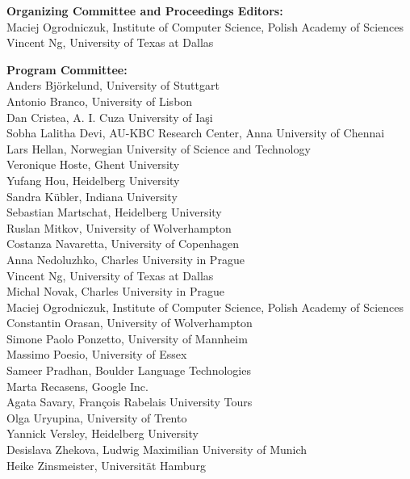 \documentclass[11pt]{article}
\begin{document}

\vspace*{0.5cm}


\begin{description}
\item{\bf Organizing Committee and Proceedings Editors:}\vspace{2mm} \\
Maciej Ogrodniczuk, Institute of Computer Science, Polish Academy of Sciences \\
Vincent Ng, University of Texas at Dallas

\vspace{3mm}
\item{\bf Program Committee:}\vspace{2mm} \\
Anders Björkelund, University of Stuttgart \\
Antonio Branco, University of Lisbon \\
Dan Cristea, A. I. Cuza University of Iaşi \\
Sobha Lalitha Devi, AU-KBC Research Center, Anna University of Chennai \\
Lars Hellan, Norwegian University of Science and Technology \\
Veronique Hoste, Ghent University \\
Yufang Hou, Heidelberg University \\
Sandra Kübler, Indiana University \\
Sebastian Martschat, Heidelberg University \\
Ruslan Mitkov, University of Wolverhampton \\
Costanza Navaretta, University of Copenhagen \\ 
Anna Nedoluzhko, Charles University in Prague \\
Vincent Ng, University of Texas at Dallas \\
Michal Novak, Charles University in Prague \\ 
Maciej Ogrodniczuk, Institute of Computer Science, Polish Academy of Sciences \\
Constantin Orasan, University of Wolverhampton \\
Simone Paolo Ponzetto, University of Mannheim \\
Massimo Poesio, University of Essex \\
Sameer Pradhan, Boulder Language Technologies \\
Marta Recasens, Google Inc. \\
Agata Savary, François Rabelais University Tours \\
Olga Uryupina, University of Trento \\
Yannick Versley, Heidelberg University \\
Desislava Zhekova, Ludwig Maximilian University of Munich \\
Heike Zinsmeister, Universität Hamburg


\end{description}
\end{document}
